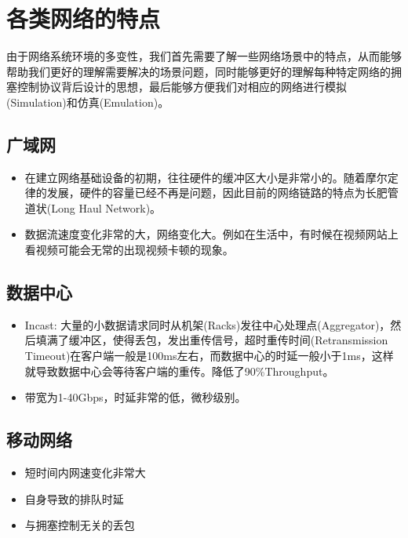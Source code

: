 \documentclass[a4paper, 12pt, UTF8]{ctexart}
\begin{document}
\clearpage

\section{各类网络的特点}
\par 由于网络系统环境的多变性，我们首先需要了解一些网络场景中的特点，从而能够帮助我们更好的理解需要解决的场景问题，同时能够更好的理解每种特定网络的拥塞控制协议背后设计的思想，最后能够方便我们对相应的网络进行模拟(Simulation)和仿真(Emulation)。

\subsection{广域网}
\begin{itemize}
	\item 在建立网络基础设备的初期，往往硬件的缓冲区大小是非常小的。随着摩尔定律的发展，硬件的容量已经不再是问题，因此目前的网络链路的特点为长肥管道状(Long Haul Network)。\cite{BDP}
	\item 数据流速度变化非常的大，网络变化大。例如在生活中，有时候在视频网站上看视频可能会无常的出现视频卡顿的现象。
\end{itemize}

\subsection{数据中心}

\begin{itemize}
	\item Incast: 大量的小数据请求同时从机架(Racks)发往中心处理点(Aggregator)，然后填满了缓冲区，使得丢包，发出重传信号，超时重传时间(Retransmission Timeout)在客户端一般是100ms左右，而数据中心的时延一般小于1ms，这样就导致数据中心会等待客户端的重传。降低了90\%Throughput\cite{DBLP:conf/sigcomm/AlizadehGMPPPSS10}。
	\item 带宽为1-40Gbps，时延非常的低，微秒级别。
\end{itemize}

\subsection{移动网络}

\begin{itemize}
	\item 短时间内网速变化非常大
	\item 自身导致的排队时延
	\item 与拥塞控制无关的丢包
\end{itemize}
\end{document}
